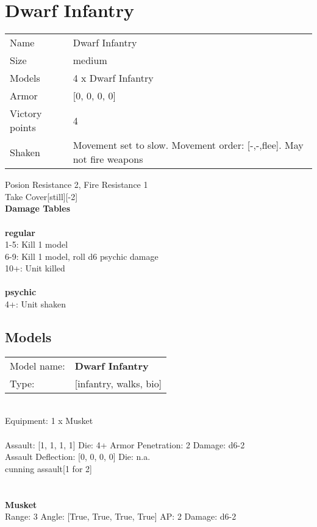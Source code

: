 \pagebreak

\section{ Dwarf Infantry }

\begin{tabular}{ll}
  Name & Dwarf Infantry \\
  Size & medium\\
  Models & 4 x Dwarf Infantry\\
  Armor & [0, 0, 0, 0]\\
  Victory points & 4\\
  Shaken & Movement set to slow. Movement order: [-,-,flee]. May not fire weapons\\
\end{tabular}

Posion Resistance 2, Fire Resistance 1\\ 
Take Cover[still][-2]\\ 



{\bf Damage Tables} \\
\ \\ {\bf regular } \\
1-5: Kill 1 model \\
6-9: Kill 1 model, roll d6 psychic damage \\
10+: Unit killed \\
\ \\ {\bf psychic } \\
4+: Unit shaken \\


\pagebreak

\subsection{ Models }

\begin{tabular}{ll}
Model name: & {\bf Dwarf Infantry } \\
Type: & [infantry, walks, bio] \\
\end{tabular}
\ \\
Equipment: 1 x Musket \\
\ \\
Assault: [1, 1, 1, 1] Die: 4+ Armor Penetration: 2 Damage: d6-2 \\
Assault Deflection: [0, 0, 0, 0] Die: n.a.\\
\indent cunning assault[1 for 2]\\ 
 
\ \\

\ \\
{\bf Musket } \\



Range: 3  Angle: [True, True, True, True] AP: 2 Damage: d6-2 \\




 
\ \\














